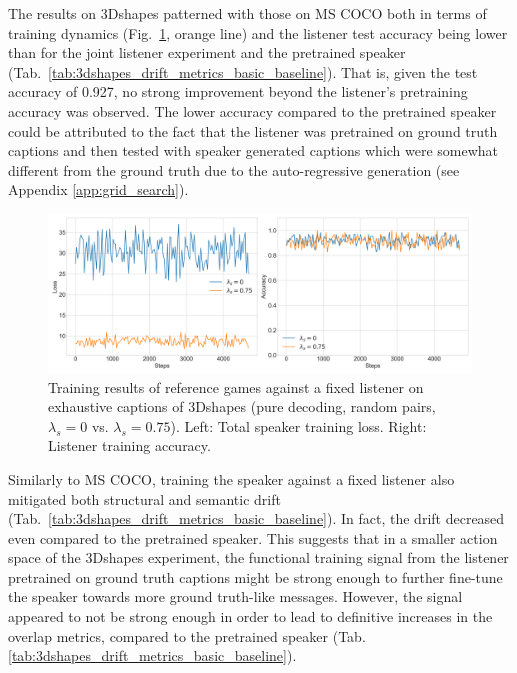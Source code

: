 The results on 3Dshapes patterned with those on MS COCO both in terms of training dynamics (Fig.~\ref{fig:3dshapes_fixed_listener_0_075_speaker_losses_listener_acc}, orange line) and the listener test accuracy being lower than for the joint listener experiment and the pretrained speaker (Tab.~\ref{tab:3dshapes_drift_metrics_basic_baseline}). That is, given the test accuracy of 0.927, no strong improvement beyond the listener's pretraining accuracy was observed. 
The lower accuracy compared to the pretrained speaker could be attributed to the fact that the listener was pretrained on ground truth captions and then tested with speaker generated captions which were somewhat different from the ground truth due to the auto-regressive generation (see Appendix \ref{app:grid_search}). 
\begin{figure}[h]
	\centering
	\includegraphics[width=\linewidth]{images/3dshapes_fixedListener_baseline_random_0_075_losses.png}
	\caption{Training results of reference games against a fixed listener on exhaustive captions of 3Dshapes (pure decoding, random pairs, $\lambda_s=0$ vs. $\lambda_s=0.75$). Left: Total speaker training loss. Right: Listener training accuracy.}
	\label{fig:3dshapes_fixed_listener_0_075_speaker_losses_listener_acc}
\end{figure}

Similarly to MS COCO, training the speaker against a fixed listener also mitigated both structural and semantic drift (Tab.~\ref{tab:3dshapes_drift_metrics_basic_baseline}). In fact, the drift decreased even compared to the pretrained speaker. This suggests that in a smaller action space of the 3Dshapes experiment, the functional training signal from the listener pretrained on ground truth captions might be strong enough to further fine-tune the speaker towards more ground truth-like messages. However, the signal appeared to not be strong enough in order to lead to definitive increases in the overlap metrics, compared to the pretrained speaker (Tab. \ref{tab:3dshapes_drift_metrics_basic_baseline}). 

